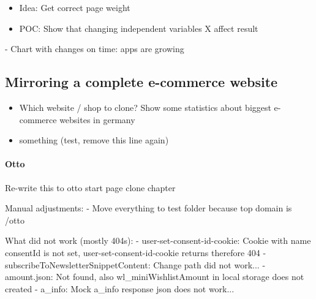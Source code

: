 \begin{itemize}
    \item Idea: Get correct page weight
    \item POC: Show that changing independent variables X affect result
\end{itemize}



- Chart with changes on time: apps are growing









\subsection{Mirroring a complete e-commerce website}

\begin{itemize}
\item Which website / shop to clone? Show some statistics about biggest e-commerce websites in germany
\item something (test, remove this line again)
\end{itemize}

\paragraph{Otto}

Re-write this to otto start page clone chapter

Manual adjustments:
- Move everything to test folder because top domain is /otto

What did not work (mostly 404s):
- user-set-consent-id-cookie: Cookie with name consentId is not set, user-set-consent-id-cookie returns therefore 404
- subscribeToNewsletterSnippetContent: Change path did not work...
- amount.json: Not found, also wl\_miniWishlistAmount in local storage does not created
- a\_info: Mock a\_info response json does not work...

